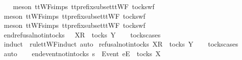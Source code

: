 \ \ \isamarkupfalse%
\ {\isacharparenleft}meson\ ttWF{\isachardot}simps{\isacharparenleft}{}{}{\isacharparenright}\ tt{\isacharunderscore}prefix{\isacharunderscore}subset{\isacharunderscore}ttWF\ tocks{\isacharunderscore}wf{\isacharparenright}\isanewline
\ \ \isamarkupfalse%
\ {\isacharparenleft}meson\ ttWF{\isachardot}simps{\isacharparenleft}{}{}{\isacharparenright}\ tt{\isacharunderscore}prefix{\isacharunderscore}subset{\isacharunderscore}ttWF\ tocks{\isacharunderscore}wf{\isacharparenright}\isanewline
\ \ \isamarkupfalse%
\ {\isacharparenleft}meson\ ttWF{\isachardot}simps{\isacharparenleft}{}{\isacharparenright}\ tt{\isacharunderscore}prefix{\isacharunderscore}subset{\isacharunderscore}ttWF\ tocks{\isacharunderscore}wf{\isacharparenright}%
\endisatagproof
{\isafoldproof}%
%
\isadelimproof
\isanewline
%
\endisadelimproof
\isanewline
{}\isamarkupfalse%
\ end{\isacharunderscore}refusal{\isacharunderscore}notin{\isacharunderscore}tocks{\isacharcolon}\ {\isachardoublequoteopen}{\isasymrho}\ {\isacharat}\ {\isacharbrackleft}{\isacharbrackleft}X{\isacharbrackright}\isactrlsub R{\isacharbrackright}\ {\isasymnotin}\ tocks\ Y{\isachardoublequoteclose}\isanewline
%
\isadelimproof
\ \ %
\endisadelimproof
%
\isatagproof
{}\isamarkupfalse%
\ tocks{\isachardot}cases\ \isamarkupfalse%
\ {\isacharparenleft}induct\ {\isasymrho}\ rule{\isacharcolon}ttWF{\isachardot}induct{\isacharcomma}\ auto{\isacharparenright}%
\endisatagproof
{\isafoldproof}%
%
\isadelimproof
\isanewline
%
\endisadelimproof
\isanewline
{}\isamarkupfalse%
\ refusal{\isacharunderscore}notin{\isacharunderscore}tocks{\isacharcolon}\ {\isachardoublequoteopen}{\isacharbrackleft}{\isacharbrackleft}X{\isacharbrackright}\isactrlsub R{\isacharbrackright}\ {\isasymnotin}\ tocks\ Y{\isachardoublequoteclose}\isanewline
%
\isadelimproof
\ \ %
\endisadelimproof
%
\isatagproof
{}\isamarkupfalse%
\ tocks{\isachardot}cases\ \isamarkupfalse%
\ auto%
\endisatagproof
{\isafoldproof}%
%
\isadelimproof
\isanewline
%
\endisadelimproof
\ \ \isanewline
{}\isamarkupfalse%
\ end{\isacharunderscore}event{\isacharunderscore}notin{\isacharunderscore}tocks{\isacharcolon}\ {\isachardoublequoteopen}s\ {\isacharat}\ {\isacharbrackleft}{\isacharbrackleft}Event\ e{\isacharbrackright}\isactrlsub E{\isacharbrackright}\ {\isasymnotin}\ tocks\ X{\isachardoublequoteclose}\isanewline
%
\isadelimproof
\ \ %
\endisadelimproof
%
